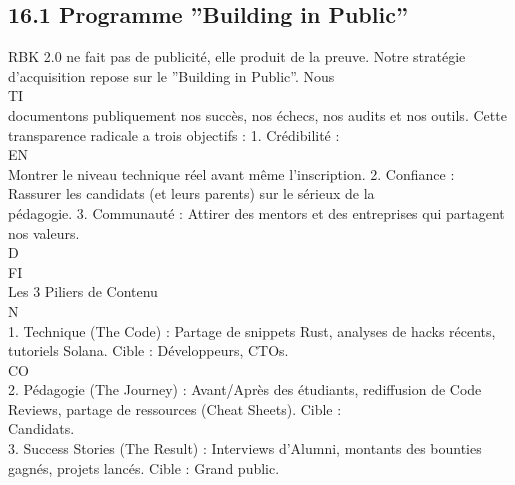 \subsection{16.1 Programme ”Building in Public”}
RBK 2.0 ne fait pas de publicité, elle produit de la preuve. Notre stratégie d’acquisition repose sur le ”Building in Public”. Nous\\
\vspace{0.5em}
\vspace{0.5em}
\vspace{0.5em}
\vspace{0.5em}
TI\\
documentons publiquement nos succès, nos échecs, nos audits et nos outils. Cette transparence radicale a trois objectifs : 1. Crédibilité :\\
\vspace{0.5em}
\vspace{0.5em}
\vspace{0.5em}
\vspace{0.5em}
EN\\
Montrer le niveau technique réel avant même l’inscription. 2. Confiance : Rassurer les candidats (et leurs parents) sur le sérieux de la\\
pédagogie. 3. Communauté : Attirer des mentors et des entreprises qui partagent nos valeurs.\\
\vspace{0.5em}
\vspace{0.5em}
\vspace{0.5em}
\vspace{0.5em}
D\\
FI\\
Les 3 Piliers de Contenu\\
\vspace{0.5em}
N\\
1. Technique (The Code) : Partage de snippets Rust, analyses de hacks récents, tutoriels Solana. Cible : Développeurs, CTOs.\\
CO\\
2. Pédagogie (The Journey) : Avant/Après des étudiants, rediffusion de Code Reviews, partage de ressources (Cheat Sheets). Cible :\\
Candidats.\\
\vspace{0.5em}
3. Success Stories (The Result) : Interviews d’Alumni, montants des bounties gagnés, projets lancés. Cible : Grand public.\\
\vspace{0.5em}
\vspace{0.5em}
